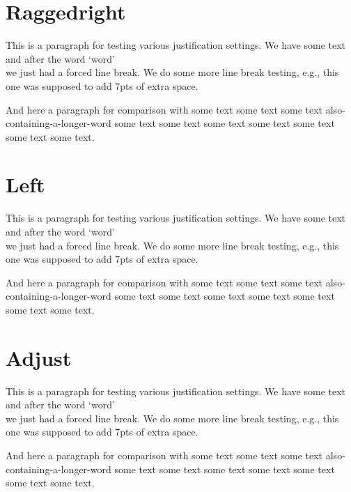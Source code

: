 \documentclass{article}
\def\trace{\tracingassigns=1\tracingall}
\begin{document}

\section{Raggedright}

This is a paragraph for testing various justification settings. We have some
text and after the word `word' \\ we just had a forced line break. We
do some more line break testing, e.g., this\\[7pt] one was supposed to
add 7pts of extra space.


And here a paragraph for comparison with some text some text some text
also-containing-a-longer-word some text some text some text some text
some text some text some text.

\section{Left}

\sloppy
This is a paragraph for testing various justification settings. We have some
text and after the word `word' \\ we just had a forced line break. We
do some more line break testing, e.g., this\\[7pt] one was supposed to
add 7pts of extra space.



And here a paragraph for comparison with some text some text some text
also-containing-a-longer-word some text some text some text some text
some text some text some text.


\section{Adjust}

\fussy
This is a paragraph for testing various justification settings. We have some
text and after the word `word' \\ we just had a forced line break. We
do some more line break testing, e.g., this\\[7pt] one was supposed to
add 7pts of extra space.


And here a paragraph for comparison with some text some text some text
also-containing-a-longer-word some text some text some text some text
some text some text some text. 
\end{document}
